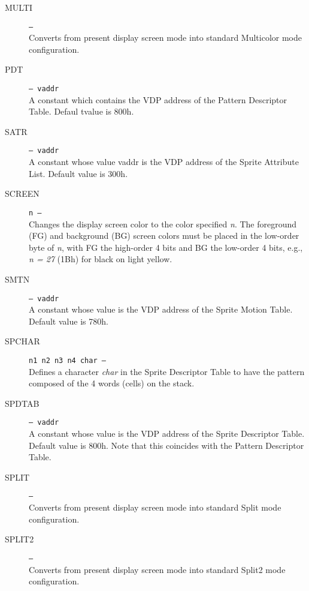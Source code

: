 \documentclass{article}
\begin{document}
\begin{multicols}{2}[]
\begin{description}
			\item[MULTI]\texttt{--- }\\
				Converts from present display screen mode into standard Multicolor
				mode configuration.

			\item[PDT]\texttt{--- vaddr }\\
				A constant which contains the VDP address of the Pattern Descriptor
				Table. Defaul tvalue is 800h.

			\item[SATR]\texttt{--- vaddr }\\
				A constant whose value vaddr is the VDP address of the Sprite
				Attribute List. Default value is 300h.

			\item[SCREEN]\texttt{n --- }\\
				Changes the display screen color to the color specified \textit{n}.
				The foreground (FG) and background (BG) screen colors must be placed
				in the low-order byte of \textit{n}, with FG the high-order 4 bits
				and BG the low-order 4 bits, e.g., \textit{n = 27} (1Bh) for black
				on light yellow.

			\item[SMTN]\texttt{--- vaddr }\\
				A constant whose value is the VDP address of the Sprite Motion
				Table. Default value is 780h.

			\item[SPCHAR]\texttt{n1 n2 n3 n4 char --- }\\
				Defines a character \textit{char} in the Sprite Descriptor Table to
				have the pattern composed of the 4 words (cells) on the stack.

			\item[SPDTAB]\texttt{--- vaddr }\\
				A constant whose value is the VDP address of the Sprite Descriptor
				Table. Default value is 800h. Note that this coincides with the
				Pattern Descriptor Table.

			\item[SPLIT]\texttt{--- }\\
				Converts from present display screen mode into standard Split mode
				configuration.

			\item[SPLIT2]\texttt{--- }\\
				Converts from present display screen mode into standard Split2 mode
				configuration.


\end{description}
\end{multicols}
\end{document}
